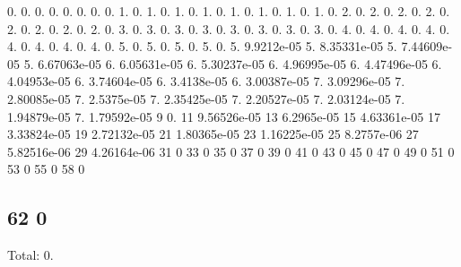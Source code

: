 0. 0. 0. 0. 0. 0. 0. 0. 1. 0. 1. 0. 1. 0. 1. 0. 1. 0. 1. 0. 1. 0. 1. 0. 2. 0. 2. 0. 2. 0. 2. 0. 2. 0. 2. 0. 2. 0. 2. 0. 3. 0. 3. 0. 3. 0. 3. 0. 3. 0. 3. 0. 3. 0. 3. 0. 4. 0. 4. 0. 4. 0. 4. 0. 4. 0. 4. 0. 4. 0. 4. 0. 5. 0. 5. 0. 5. 0. 5. 0. 5. 9.\+9212e-\/05 5. 8.\+35331e-\/05 5. 7.\+44609e-\/05 5. 6.\+67063e-\/05 6. 6.\+05631e-\/05 6. 5.\+30237e-\/05 6. 4.\+96995e-\/05 6. 4.\+47496e-\/05 6. 4.\+04953e-\/05 6. 3.\+74604e-\/05 6. 3.\+4138e-\/05 6. 3.\+00387e-\/05 7. 3.\+09296e-\/05 7. 2.\+80085e-\/05 7. 2.\+5375e-\/05 7. 2.\+35425e-\/05 7. 2.\+20527e-\/05 7. 2.\+03124e-\/05 7. 1.\+94879e-\/05 7. 1.\+79592e-\/05 9 0. 11 9.\+56526e-\/05 13 6.\+2965e-\/05 15 4.\+63361e-\/05 17 3.\+33824e-\/05 19 2.\+72132e-\/05 21 1.\+80365e-\/05 23 1.\+16225e-\/05 25 8.\+2757e-\/06 27 5.\+82516e-\/06 29 4.\+26164e-\/06 31 0 33 0 35 0 37 0 39 0 41 0 43 0 45 0 47 0 49 0 51 0 53 0 55 0 58 0 \subsection*{62 0 }

Total\+: 0. 